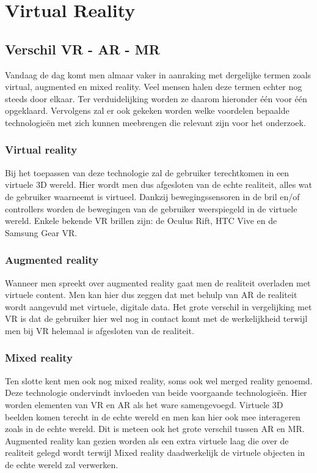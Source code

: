 \section{Virtual Reality}

\subsection{Verschil VR - AR - MR}
Vandaag de dag komt men almaar vaker in aanraking met dergelijke termen zoals virtual, augmented en mixed reality. Veel mensen halen deze termen echter nog steeds door elkaar. Ter verduidelijking worden ze daarom hieronder één voor één opgeklaard. Vervolgens zal er ook  gekeken worden welke voordelen bepaalde technologieën met zich kunnen meebrengen die relevant zijn voor het onderzoek. 

\subsubsection{Virtual reality}
Bij het toepassen van deze technologie zal de gebruiker terechtkomen in een virtuele 3D wereld. Hier wordt men dus afgesloten van de echte realiteit, alles wat de gebruiker waarneemt is virtueel. Dankzij bewegingssensoren in de bril en/of controllers worden de bewegingen van de gebruiker weerspiegeld in de virtuele wereld. Enkele bekende VR brillen zijn: de Oculus Rift, HTC Vive en de Samsung Gear VR.

\subsubsection{Augmented reality}
Wanneer men spreekt over augmented reality gaat men de realiteit overladen met virtuele content. Men kan hier dus zeggen dat met behulp van AR de realiteit wordt aangevuld met virtuele, digitale data. Het grote verschil in vergelijking met VR is dat de gebruiker hier wel nog in contact komt met de werkelijkheid terwijl men bij VR helemaal is afgesloten van de realiteit.

\subsubsection{Mixed reality}
Ten slotte kent men ook nog mixed reality, soms ook wel merged reality genoemd. Deze technologie ondervindt invloeden van beide voorgaande technologieën. Hier worden elementen van VR en AR als het ware samengevoegd. Virtuele 3D beelden komen terecht in de echte wereld en men kan hier ook mee interageren zoals in de echte wereld. Dit is meteen ook het grote verschil tussen AR en MR. Augmented reality kan gezien worden als een extra virtuele laag die over de realiteit gelegd wordt terwijl Mixed reality daadwerkelijk de virtuele objecten in de echte wereld zal verwerken.

